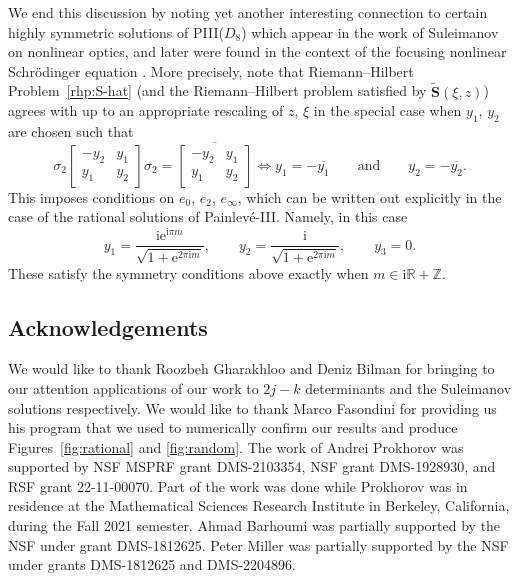 \documentclass[pdftex]{sigma}
\numberwithin{equation}{section}
\newcommand{\ee}{\mathrm{e}}
\newcommand{\ii}{\mathrm{i}}
\newcommand{\R}{{\mathbb{R}}}
\newcommand{\Z}{{\mathbb{Z}}}
\begin{document}
We end this discussion by noting yet another interesting connection to certain highly symmetric solutions of PIII($D_8$) which appear in the work of Suleimanov \cite{suleimanov} on nonlinear optics, and later were found in the context of the focusing nonlinear Schr\"odinger equation \cite{MR4007631, BLM20}. More precisely, note that Riemann--Hilbert Problem~\ref{rhp:S-hat} (and the Riemann--Hilbert problem satisfied by $\widetilde{\mathbf{S}}(\xi, z)$) agrees with \cite[Riemann--Hilbert Problem 4]{MR4007631} up to an appropriate rescaling of $z$, $\xi$ in the special case when $y_1$, $y_2$ are chosen such that
\begin{equation} \label{eq:suleimanov condition}
\sigma_2 \begin{bmatrix} -y_2 & y_1 \\ y_1 & y_2 \end{bmatrix} \sigma_2 = \overline{\begin{bmatrix} -y_2 & y_1 \\ y_1 & y_2 \end{bmatrix}} \Leftrightarrow y_1 = -\overline{y_1} \qquad \text{and} \qquad y_2 = -\overline{y_2}.
\end{equation}
This imposes conditions on $e_0$, $e_2$, $e_\infty$, which can be written out explicitly in the case of the rational solutions of Painlev\'e-III. Namely, in this case
\[
y_1 = \frac{\ii \ee^{\ii\pi m}}{\sqrt{1+ \ee^{2\pi \ii m}}}, \qquad y_2 = \frac{\ii }{\sqrt{1+ \ee^{2\pi \ii m}}}, \qquad y_3 = 0.
\]
These satisfy the symmetry conditions above exactly when $m \in \ii\R +\Z$.

\subsection*{Acknowledgements}

We would like to thank Roozbeh Gharakhloo and Deniz Bilman for bringing to our attention applications of our work to $2j-k$ determinants and the Suleimanov solutions respectively. We would like to thank Marco Fasondini for providing us his program that we used to numerically confirm our results and produce Figures~\ref{fig:rational} and \ref{fig:random}. The work of Andrei Prokhorov was supported by NSF MSPRF grant DMS-2103354, NSF grant DMS-1928930, and RSF grant 22-11-00070. Part of the work was done while Prokhorov was in residence at the Mathematical Sciences Research Institute in Berkeley, California, during the Fall 2021 semester. Ahmad Barhoumi was partially supported by the NSF under grant DMS-1812625. Peter Miller was partially supported by the NSF under grants DMS-1812625 and DMS-2204896.
\end{document}
